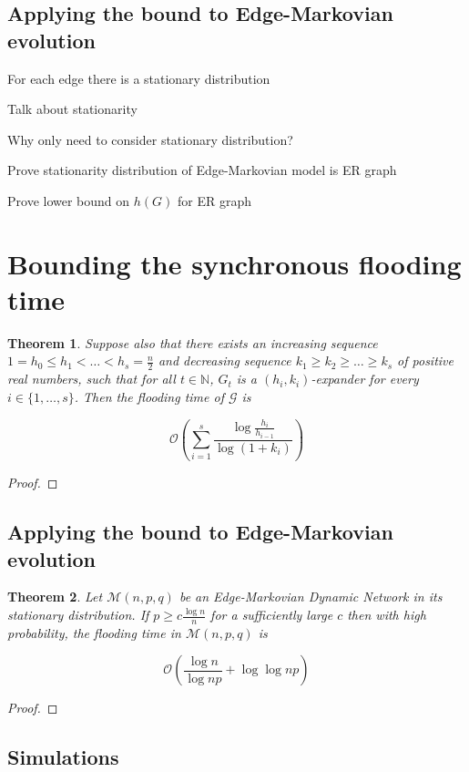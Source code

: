 \documentclass[a4paper,11pt]{article}
\newtheorem{theorem}{Theorem}[section]
\theoremstyle{definition}
\begin{document}
\subsection{Applying the bound to Edge-Markovian evolution}

For each edge there is a stationary distribution

Talk about stationarity

Why only need to consider stationary distribution?

Prove stationarity distribution of Edge-Markovian model is ER graph

Prove lower bound on $h(G)$ for ER graph

\section{Bounding the synchronous flooding time}

\begin{theorem}
	\ModelIntro Suppose also that there exists an increasing sequence $1 = h_0 \leq h_1 < \dots < h_s = \frac{n}{2}$ and decreasing sequence $k_1 \geq k_2 \geq \dots \geq k_s$ of positive real numbers, such that for all $t \in \mathbb{N}$, $G_t$ is a $(h_i, k_i)$-expander for every $i \in \{1, \dots , s\}$. Then the flooding time of $\mathcal{G}$ is

	$$
		\mathcal{O}\left(\sum_{i=1}^s \frac{\log \frac{h_i}{h_{i-1}}}{\log(1+k_i)}\right)
	$$
\end{theorem}

\begin{proof}
	
\end{proof}

\subsection{Applying the bound to Edge-Markovian evolution}

\begin{theorem}
	Let $\mathcal{M}(n, p, q)$ be an Edge-Markovian Dynamic Network in its stationary distribution. If $p \geq c \frac{\log n}{n}$ for a sufficiently large $c$ then with high probability, the flooding time in $\mathcal{M}(n, p, q)$ is 

	$$
		\mathcal{O}\left(\frac{\log n}{\log np} + \log \log np \right)
	$$
\end{theorem}

\begin{proof}
	
\end{proof}


\subsection{Simulations}
\end{document}

